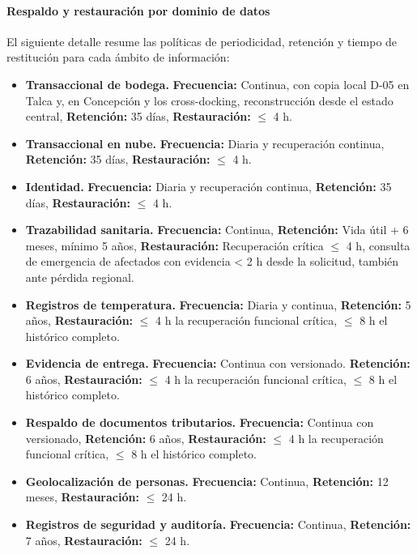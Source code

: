 \paragraph*{Respaldo y restauración por dominio de datos}
\label{tab:jd12}
El siguiente detalle resume las políticas de periodicidad, retención y tiempo de restitución para cada ámbito de información:
\begin{itemize}
\item \textbf{Transaccional de bodega.} \textbf{Frecuencia:} Continua, con copia local D-05 en Talca y, en Concepción y los cross-docking, reconstrucción desde el estado central, \textbf{Retención:} 35 días, \textbf{Restauración:} $\leq$ 4 h.
\item \textbf{Transaccional en nube.} \textbf{Frecuencia:} Diaria y recuperación continua, \textbf{Retención:} 35 días, \textbf{Restauración:} $\leq$ 4 h.
\item \textbf{Identidad.} \textbf{Frecuencia:} Diaria y recuperación continua, \textbf{Retención:} 35 días, \textbf{Restauración:} $\leq$ 4 h.
\item \textbf{Trazabilidad sanitaria.} \textbf{Frecuencia:} Continua, \textbf{Retención:} Vida útil + 6 meses, mínimo 5 años, \textbf{Restauración:} Recuperación crítica $\leq$ 4 h, consulta de emergencia de afectados con evidencia < 2 h desde la solicitud, también ante pérdida regional.
\item \textbf{Registros de temperatura.} \textbf{Frecuencia:} Diaria y continua, \textbf{Retención:} 5 años, \textbf{Restauración:} $\leq$ 4 h la recuperación funcional crítica, $\leq$ 8 h el histórico completo.
\item \textbf{Evidencia de entrega.} \textbf{Frecuencia:} Continua con versionado. \textbf{Retención:} 6 años, \textbf{Restauración:} $\leq$ 4 h la recuperación funcional crítica, $\leq$ 8 h el histórico completo.
\item \textbf{Respaldo de documentos tributarios.} \textbf{Frecuencia:} Continua con versionado, \textbf{Retención:} 6 años, \textbf{Restauración:} $\leq$ 4 h la recuperación funcional crítica, $\leq$ 8 h el histórico completo.
\item \textbf{Geolocalización de personas.} \textbf{Frecuencia:} Continua, \textbf{Retención:} 12 meses, \textbf{Restauración:} $\leq$ 24 h.
\item \textbf{Registros de seguridad y auditoría.} \textbf{Frecuencia:} Continua, \textbf{Retención:} 7 años, \textbf{Restauración:} $\leq$ 24 h.
\end{itemize}


